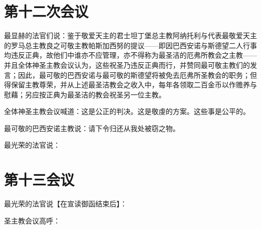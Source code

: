 \par


\section{第十二次会议}

最显赫的法官们说：鉴于敬爱天主的君士坦丁堡总主教阿纳托利与代表最敬爱天主的罗马总主教良之可敬主教帕斯加西努的提议——即因巴西安诺与斯德望二人行事均违反正典，故他们中谁亦不应管理，亦不得称为最圣洁的厄弗所教会之主教——并且全体神圣主教会议认为，这些祝圣乃违反正典而行，并赞同最可敬主教们的发言；因此，最可敬的巴西安诺与最可敬的斯德望将被免去厄弗所圣教会的职务；但得保留主教尊荣，并从上述最圣洁教会之收入中，每年各领取二百金币以作赡养与慰藉；另应按正典为最圣洁的教会祝圣另一位主教。\par

全体神圣主教会议喊道：这是公正的判决。这是敬虔的方案。这些事是公平的。\par

最可敬的巴西安诺主教说：请下令归还从我处被窃之物。\par

最光荣的法官说：\par

\par


\section{第十三会议}

最光荣的法官说【在宣读御函结束后】：\par

圣主教会议高呼：\par

